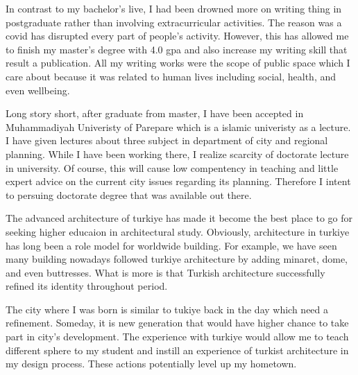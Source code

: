 \documentclass[12pt]{simart} %
\begin{document}
In contrast to my bachelor's live, I had been drowned more on writing thing in postgraduate rather than involving extracurricular activities. The reason was a covid has disrupted every part of people's activity. However, this has allowed me to finish my master's degree with 4.0 gpa and also increase my writing skill that result a publication. All my writing works were the scope of public space which I care about because it was related to human lives including social, health, and even wellbeing.

Long story short, after graduate from master, I have been accepted in Muhammadiyah Univeristy of Parepare which is a islamic univeristy as a lecture. I have given lectures about three subject in department of city and regional planning. While I have been working there, I realize scarcity of doctorate lecture in university. Of course, this will cause low compentency in teaching and little expert advice on the current city issues regarding its planning. Therefore I intent to persuing doctorate degree that was available out there.

The advanced architecture of turkiye has made it become the best place to go for seeking higher educaion in architectural study. Obviously, architecture in turkiye has long been a role model for worldwide building. For example, we have seen many building nowadays followed turkiye architecture by adding minaret, dome, and even buttresses. What is more is that Turkish architecture successfully refined its identity throughout period.

The city where I was born is similar to tukiye back in the day which need a refinement. Someday, it is new generation that would have higher chance to take part in city's development. The experience with turkiye would allow me to teach different sphere to my student and instill an experience of turkist architecture in my design process. These actions potentially level up my hometown.




\end{document}
